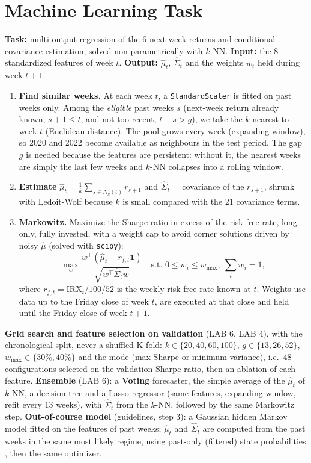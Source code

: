 \documentclass[11pt,a4paper]{article}
\newcommand{\changed}[1]{#1}
\begin{document}
\section{Machine Learning Task}
\textbf{Task:} multi-output regression of the 6 next-week returns and conditional covariance estimation, solved non-parametrically with $k$-NN. \textbf{Input:} the 8 standardized features of week $t$.
\textbf{Output:} $\hat\mu_t$, $\hat\Sigma_t$ and the weights $w_t$ held during week $t+1$.
\begin{enumerate}
\item \textbf{Find similar weeks.} At each week $t$, a \texttt{StandardScaler} is fitted on past weeks only. Among the
\emph{eligible} past weeks $s$ \changed{(next-week return already known, $s+1\le t$, and not too recent, $t-s>g$), we}
take the $k$ nearest to week $t$ (Euclidean distance). The pool grows every week (expanding window), so
2020 and 2022 become available as neighbours in the test period. The gap $g$ is needed because the features are
persistent: without it, the nearest weeks are simply the last few weeks and $k$-NN collapses into a rolling window.
\item \textbf{Estimate} $\hat\mu_t=\frac1k\sum_{s\in N_k(t)} r_{s+1}$ and $\hat\Sigma_t$ = covariance of the $r_{s+1}$, shrunk with
Ledoit-Wolf \cite{ledoit2004} because $k$ is small compared with the 21 covariance terms.
\item \textbf{Markowitz.} Maximize the Sharpe ratio in excess of the risk-free rate, long-only, fully invested,
with a weight cap to avoid corner solutions driven by noisy $\hat\mu$ (solved with \texttt{scipy}):
\[\max_w \frac{w^\top(\hat\mu_t-\changed{r_{f,t}}\mathbf 1)}{\sqrt{w^\top\hat\Sigma_t w}}\quad\text{s.t. } 0\le w_i\le w_{\max},\ \textstyle\sum_i w_i=1,\]
\changed{where $r_{f,t}=\mathrm{IRX}_t/100/52$ is the weekly risk-free rate known at $t$. Weights use data up to the Friday close of week $t$, are executed at that close and held until the Friday close of week $t+1$.}
\end{enumerate}
\changed{\textbf{Grid search and feature selection on validation} (LAB 6, LAB 4), with the chronological split, never a shuffled K-fold:}
$k\in\{20,40,60,100\}$, $g\in\{13,26,52\}$, $w_{\max}\in\{30\%,40\%\}$ \changed{and the mode (max-Sharpe or minimum-variance), i.e.\ 48 configurations selected on the validation Sharpe ratio, then an ablation of each feature.}
\changed{\textbf{Ensemble} (LAB 6): a \textbf{Voting} forecaster, the simple average of the $\hat\mu_t$ of $k$-NN, a decision tree and a Lasso regressor (same features, expanding window, refit every 13 weeks), with $\hat\Sigma_t$ from the $k$-NN, followed by the same Markowitz step.}
\changed{\textbf{Out-of-course model} (guidelines, step 3): a Gaussian hidden Markov model fitted on the features of past weeks; $\hat\mu_t$ and $\hat\Sigma_t$ are computed from the past weeks in the same most likely regime, using past-only (filtered) state probabilities \cite{angbekaert}, then the same optimizer.}
\end{document}
